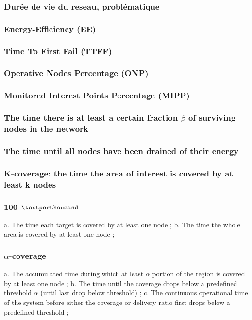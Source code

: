 \subsubsection{Durée de vie du reseau, problématique}
\subsubsection{Energy-Efficiency (EE)}
\subsubsection{Time To First Fail (TTFF)}
\subsubsection{Operative Nodes Percentage (ONP)}
\subsubsection{Monitored Interest Points Percentage (MIPP)}
\subsubsection{The time there is at least a certain fraction $\beta$ of surviving nodes in the network }
\subsubsection{The time until all nodes have been drained of their energy }
\subsubsection{K-coverage: the time the area of interest is covered by at least k nodes }
\subsubsection{100 $\textperthousand$}
a. The time each target is covered by at least one node  ;
b. The time the whole area is covered by at least one node  ;

\subsubsection{$\alpha$-coverage}
a. The accumulated time during which at least $\alpha$ portion of the region is covered by
at least one node ;
b. The time until the coverage drops below a predefined threshold $\alpha$ (until last drop
below threshold)  ;
c. The continuous operational time of the system before either the coverage or
delivery ratio first drops below a predefined threshold ;

